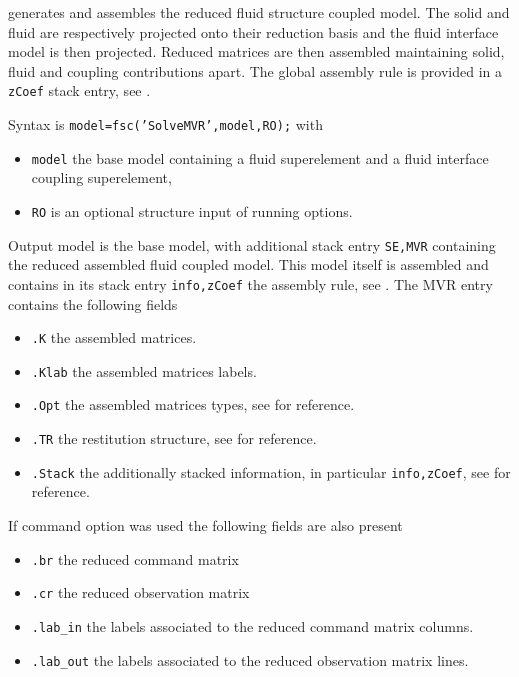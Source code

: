 \begin{SDT}

 generates and assembles the reduced fluid structure coupled model. The solid and fluid are respectively projected onto their reduction basis and the fluid interface model is then projected. Reduced matrices are then assembled maintaining solid, fluid and coupling contributions apart. The global assembly rule is provided in a {\tt zCoef} stack entry, see . 

Syntax is {\tt model=fsc('SolveMVR',model,RO);} with
\begin{itemize}
\item {\tt model} the base model containing a fluid superelement and a fluid interface coupling superelement,
\item {\tt RO} is an optional structure input of running options.
\end{itemize}

Output model is the base model, with additional stack entry {\tt SE,MVR} containing the reduced assembled fluid coupled model. This model itself is assembled and contains in its stack entry {\tt info,zCoef} the assembly rule, see . The MVR entry contains the following fields
\begin{itemize}
\item {\tt .K} the assembled matrices.
\item {\tt .Klab} the assembled matrices labels.
\item {\tt .Opt} the assembled matrices types, see  for reference.
\item {\tt .TR} the restitution structure, see  for reference.
\item {\tt .Stack} the additionally stacked information, in particular {\tt info,zCoef}, see  for reference.
\end{itemize}
If command option  was used the following fields are also present
\begin{itemize}
\item {\tt .br} the reduced command matrix
\item {\tt .cr} the reduced observation matrix
\item {\tt .lab\_in} the labels associated to the reduced command matrix columns.
\item {\tt .lab\_out} the labels associated to the reduced observation matrix lines.
\end{itemize}


\end{SDT}
